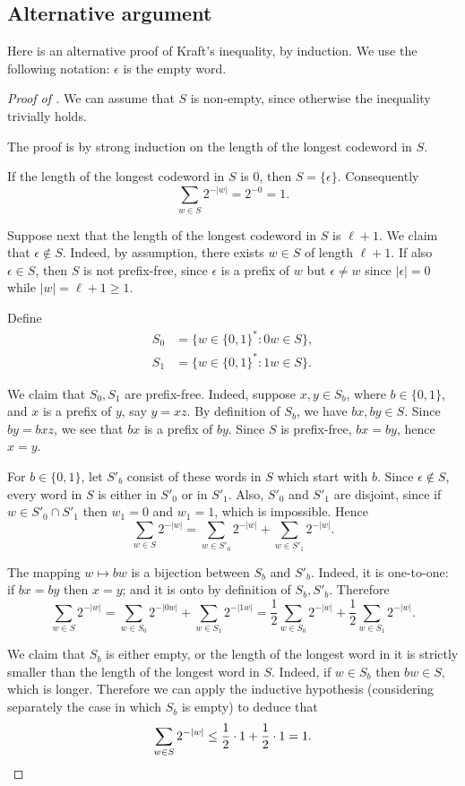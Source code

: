 \pagebreak

\subsection{Alternative argument}

Here is an alternative proof of Kraft's inequality, by induction. We use the following notation: $\epsilon$ is the empty word.

\begin{proof}[Proof of ]
We can assume that $S$ is non-empty, since otherwise the inequality trivially holds.

The proof is by strong induction on the length of the longest codeword in $S$.

If the length of the longest codeword in $S$ is $0$, then $S = \{ \epsilon \}$. Consequently
\[
 \sum_{w \in S} 2^{-|w|} = 2^{-0} = 1.
\]

Suppose next that the length of the longest codeword in $S$ is $\ell + 1$. We claim that $\epsilon \notin S$. Indeed, by assumption, there exists $w \in S$ of length $\ell + 1$. If also $\epsilon \in S$, then $S$ is not prefix-free, since $\epsilon$ is a prefix of $w$ but $\epsilon \neq w$ since $|\epsilon| = 0$ while $|w| = \ell+1 \geq 1$.

Define
\begin{align*}
    S_0 &= \{ w \in \{0,1\}^* : 0w \in S \}, \\
    S_1 &= \{ w \in \{0,1\}^* : 1w \in S \}.
\end{align*}

We claim that $S_0,S_1$ are prefix-free. Indeed, suppose $x,y \in S_b$, where $b \in \{0,1\}$, and $x$ is a prefix of $y$, say $y = xz$. By definition of $S_b$, we have $bx,by \in S$. Since $by = bxz$, we see that $bx$ is a prefix of $by$. Since $S$ is prefix-free, $bx = by$, hence $x = y$.

For $b \in \{0,1\}$, let $S'_b$ consist of these words in $S$ which start with $b$.
Since $\epsilon \notin S$, every word in $S$ is either in $S'_0$ or in $S'_1$. Also, $S'_0$ and $S'_1$ are disjoint, since if $w \in S'_0 \cap S'_1$ then $w_1 = 0$ and $w_1 = 1$, which is impossible. Hence
\[
 \sum_{w \in S} 2^{-|w|} =
 \sum_{w \in S'_0} 2^{-|w|} +
 \sum_{w \in S'_1} 2^{-|w|}.
\]

The mapping $w \mapsto bw$ is a bijection between $S_b$ and $S'_b$. Indeed, it is one-to-one: if $bx = by$ then $x = y$; and it is onto by definition of $S_b,S'_b$. Therefore
\[
 \sum_{w \in S} 2^{-|w|} =
 \sum_{w \in S_0} 2^{-|0w|} +
 \sum_{w \in S_1} 2^{-|1w|} =
 \frac{1}{2} \sum_{w \in S_0} 2^{-|w|} +
 \frac{1}{2} \sum_{w \in S_1} 2^{-|w|}.
\]

We claim that $S_b$ is either empty, or the length of the longest word in it is strictly smaller than the length of the longest word in $S$. Indeed, if $w \in S_b$ then $bw \in S$, which is longer. Therefore we can apply the inductive hypothesis (considering separately the case in which $S_b$ is empty) to deduce that
\[
 \sum_{w \in S} 2^{-|w|} \leq \frac{1}{2} \cdot 1 + \frac{1}{2} \cdot 1 = 1. \qedhere
\]
\end{proof}

